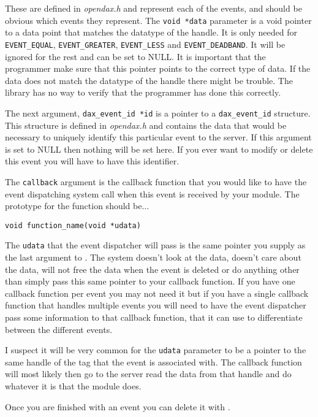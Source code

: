 These are defined in \textit{opendax.h} and represent each of the events, and should be obvious which events they represent.  The \verb|void *data| parameter is a void pointer to a data point that matches the datatype of the handle.  It is only needed for \verb|EVENT_EQUAL|, \verb|EVENT_GREATER|, \verb|EVENT_LESS| and \verb|EVENT_DEADBAND|.  It will be ignored for the rest and can be set to NULL.  It is important that the programmer make sure that this pointer points to the correct type of data.  If the data does not match the datatype of the handle there might be trouble.  The library has no way to verify that the programmer has done this correctly.

The next argument, \verb|dax_event_id *id| is a pointer to a \texttt{dax\_event\_id} structure.  This structure is defined in \textit{opendax.h} and contains the data that would be necessary to uniquely identify this particular event to the server.  If this argument is set to NULL then nothing will be set here.  If you ever want to modify or delete this event you will have to have this identifier.

The \texttt{callback} argument is the callback function that you would like to have the event dispatching system call when this event is received by your module.  The prototype for the function should be...
\begin{verbatim}
void function_name(void *udata)
\end{verbatim}
The \texttt{udata} that the event dispatcher will pass is the same pointer you supply as the last argument to \eventadd.  The system doesn't look at the data, doesn't care about the data, will not free the data when the event is deleted or do anything other than simply pass this same pointer to your callback function.  If you have one callback function per event you may not need it but if you have a single callback function that handles multiple events you will need to have the event dispatcher pass some information to that callback function, that it can use to differentiate between the different events.

I suspect it will be very common for the \texttt{udata} parameter to be a pointer to the same handle of the tag that the event is associated with.  The callback function will most likely then go to the server read the data from that handle and do whatever it is that the module does.  

Once you are finished with an event you can delete it with \eventdel.

